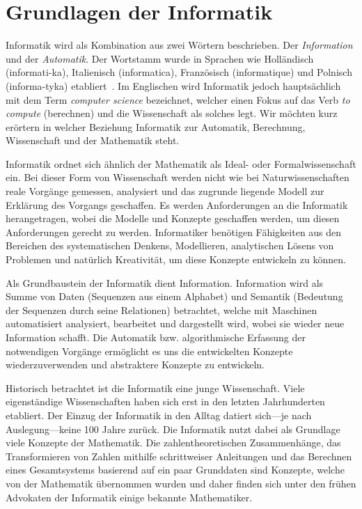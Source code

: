 \chapter{Grundlagen der Informatik}
%
Informatik wird als Kombination aus zwei Wörtern beschrieben. Der
\emph{Information} und der \emph{Automatik}. Der Wortstamm wurde in
Sprachen wie Holländisch (informati-ka), Italienisch (informatica),
Französisch (informatique) und Polnisch (informa-tyka)
etabliert~\cite[p. 21]{Balzert04}.
Im Englischen wird Informatik
jedoch hauptsächlich mit dem Term \emph{computer science} bezeichnet,
welcher einen Fokus auf das Verb \emph{to compute} (berechnen) und
die Wissenschaft als solches legt. Wir möchten kurz erörtern in
welcher Beziehung Informatik zur Automatik, Berechnung, Wissenschaft
und der Mathematik steht.

Informatik ordnet sich ähnlich der Mathematik als Ideal- oder
Formalwissenschaft ein. Bei dieser Form von Wissenschaft werden nicht
wie bei Naturwissenschaften reale Vorgänge gemessen, analysiert und das
zugrunde liegende Modell zur Erklärung des Vorgangs geschaffen. Es werden
Anforderungen an die Informatik herangetragen, wobei die Modelle und
Konzepte geschaffen werden, um diesen Anforderungen gerecht zu werden.
Informatiker benötigen Fähigkeiten aus den Bereichen des systematischen
Denkens, Modellieren, analytischen Lösens von Problemen und natürlich
Kreativität, um diese Konzepte entwickeln zu können.

Als Grundbaustein der Informatik dient Information. Information
wird als Summe von Daten (Sequenzen aus einem Alphabet) und Semantik
(Bedeutung der Sequenzen durch seine Relationen) betrachtet, welche mit
Maschinen automatisiert analysiert, bearbeitet und dargestellt wird,
wobei sie wieder neue Information schafft. Die Automatik bzw. algorithmische
Erfassung der notwendigen Vorgänge ermöglicht es uns die entwickelten
Konzepte wiederzuverwenden und abstraktere Konzepte zu entwickeln.

Historisch betrachtet ist die Informatik eine junge Wissenschaft. Viele
eigenständige Wissenschaften haben sich erst in den letzten Jahrhunderten
etabliert. Der Einzug der Informatik in den Alltag datiert sich---je nach
Auslegung---keine 100 Jahre zurück. Die Informatik nutzt dabei als
Grundlage viele Konzepte der Mathematik. Die zahlentheoretischen
Zusammenhänge, das Transformieren von Zahlen mithilfe schrittweiser
Anleitungen und das Berechnen eines Gesamtsystems basierend auf ein paar
Grunddaten sind Konzepte, welche von der Mathematik übernommen wurden
und daher finden sich unter den frühen Advokaten der Informatik
einige bekannte Mathematiker.

